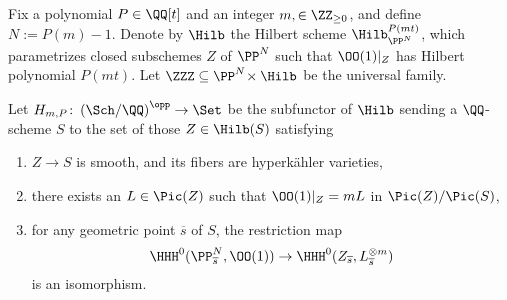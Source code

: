 Fix a polynomial $P \in \QQ[t]$ and an integer $m, \in \ZZ_{\geq 0}$, and define $N := P(m) - 1$. Denote by $\Hilb$ the Hilbert scheme $\Hilb_{\PP^N}^{P(mt)}$, which parametrizes closed subschemes $Z$ of $\PP^N$ such that $\OO(1)|_Z$ has Hilbert polynomial $P(mt)$. Let $\ZZZ \subseteq \PP^N\!\times \Hilb$ be the universal family.

Let $H_{m,P}\colon \left({\Sch}/{\QQ}\right)^{\opp} \rightarrow \Set$ be the subfunctor of $\Hilb$ sending a $\QQ$-scheme $S$ to the set of those $Z \in \Hilb(S)$ satisfying
\begin{enumerate}
\item $Z \rightarrow S$ is smooth, and its fibers are hyperk\"ahler varieties,
\item there exists an $L \in \Pic(Z)$ such that $\OO(1)|_{Z} = mL$ in $\Pic(Z)/\Pic(S)$,
\item for any geometric point $\overline{s}$ of $S$, the restriction map
$$
\HHH^0(\PP^N_{\overline{s}}, \OO(1)) \rightarrow \HHH^0(Z_{\overline{s}},L_{\overline{s}}^{\otimes m})
$$
is an isomorphism.
\end{enumerate}

